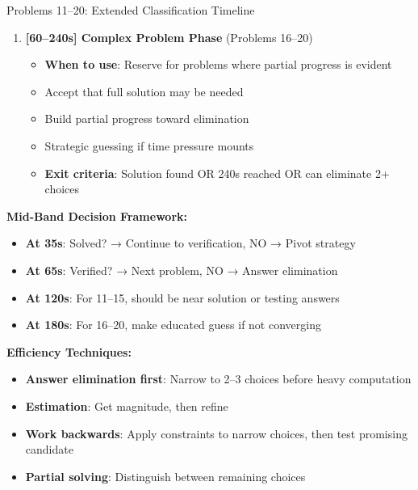 \documentclass{article}
\begin{document}
\begin{timebox}{Problems 11--20: Extended Classification Timeline}
\begin{enumerate}
   \begin{itemize}
   \item \textbf{When to use}: Enter this phase only if making clear progress at 65s
   \item Continue systematic execution with current technique
   \item May attempt one alternative technique if primary fails
   \item Use answer choices to guide/verify work
   \item \textbf{Exit criteria}: Solution found OR 180s reached OR no further progress
   \end{itemize}
\item \textbf{[60--240s] Complex Problem Phase} (Problems 16--20)
   \begin{itemize}
   \item \textbf{When to use}: Reserve for problems where partial progress is evident
   \item Accept that full solution may be needed
   \item Build partial progress toward elimination
   \item Strategic guessing if time pressure mounts
   \item \textbf{Exit criteria}: Solution found OR 240s reached OR can eliminate 2+ choices
   \end{itemize}
\end{enumerate}

\textbf{Mid-Band Decision Framework:}
\begin{itemize}[nosep]
\item \textbf{At 35s}: Solved? → Continue to verification, NO → Pivot strategy
\item \textbf{At 65s}: Verified? → Next problem, NO → Answer elimination
\item \textbf{At 120s}: For 11--15, should be near solution or testing answers
\item \textbf{At 180s}: For 16--20, make educated guess if not converging
\end{itemize}

\textbf{Efficiency Techniques:}
\begin{itemize}[nosep]
\item \textbf{Answer elimination first}: Narrow to 2--3 choices before heavy computation
\item \textbf{Estimation}: Get magnitude, then refine
\item \textbf{Work backwards}: Apply constraints to narrow choices, then test promising candidate
\item \textbf{Partial solving}: Distinguish between remaining choices
\end{itemize}


\end{timebox}
\end{document}

